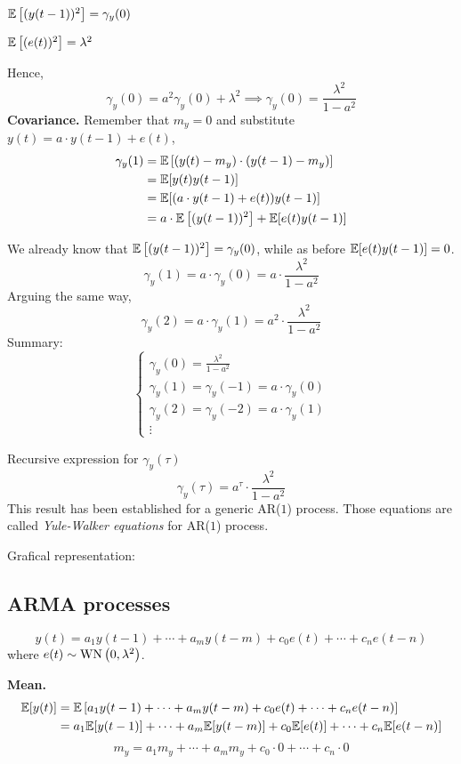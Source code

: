 $\mathbb{E}\left[(y(t-1))^{2}\right]=\gamma_{y}(0)$

$\mathbb{E}\left[(e(t))^{2}\right]=\lambda^{2}$

Hence,
\[
	\gamma_{y}(0)=a^{2} \gamma_{y}(0)+\lambda^{2} \implies \gamma_{y}(0)=\frac{\lambda^{2}}{1-a^{2}}
\]
\textbf{Covariance.}
Remember that $m_{y}=0$ and substitute $y(t)=a \cdot y(t-1)+e(t)$,
\begin{align*}
	\gamma_{y}(1)&=\mathbb{E}\left[\left(y(t)-m_{y}\right) \cdot\left(y(t-1)-m_{y}\right)\right]\\
	&=\mathbb{E}[y(t) y(t-1)]\\
	&=\mathbb{E}[(a \cdot y(t-1)+e(t))y(t-1)]\\
	&=a \cdot \mathbb{E}\left[(y(t-1))^{2}\right]+\mathbb{E}[e(t) y(t-1)]
\end{align*}

We already know that $\mathbb{E}\left[(y(t-1))^{2}\right]=\gamma_{y}(0)$, while as before $\mathbb{E}[e(t) y(t-1)]=0$.
$$
\gamma_{y}(1)=a \cdot \gamma_{y}(0)=a \cdot \frac{\lambda^{2}}{1-a^{2}}
$$
Arguing the same way,
\[
	\gamma_{y}(2)=a \cdot \gamma_{y}(1)=a^{2} \cdot \frac{\lambda^{2}}{1-a^{2}}
\]
Summary:
\begin{equation*}
	\boxed{
		\begin{cases}
			\gamma_{y}(0)=\frac{\lambda^{2}}{1-a^{2}} \\
			\gamma_{y}(1)=\gamma_{y}(-1)=a \cdot \gamma_{y}(0) \\
			\gamma_{y}(2)=\gamma_{y}(-2)=a \cdot \gamma_{y}(1) \\
			\vdots
		\end{cases}
	}
\end{equation*}

Recursive expression for $\gamma_{y}(\tau)$
$$
	\gamma_{y}(\tau)=a^{\tau} \cdot \frac{\lambda^{2}}{1-a^{2}}
$$
This result has been established for a generic AR($1$) process.
Those equations are called \emph{Yule-Walker equations} for AR($1$) process.

Grafical representation:



\subsection{ARMA processes}
$$
y(t)=a_{1} y(t-1)+\cdots+a_{m} y(t-m)+c_{0} e(t)+\cdots+c_{n} e(t-n)
$$
where $e(t) \sim \operatorname{WN}\left(0, \lambda^{2}\right)$.

\textbf{Mean.}
\begin{align*}
	\mathbb{E}[y(t)] &=\mathbb{E}\left[a_{1} y(t-1)+\cdots+a_{m} y(t-m)+c_{0} e(t)+\cdots+c_{n} e(t-n)\right] \\
	&=a_{1} \mathbb{E}[y(t-1)]+\cdots+a_{m} \mathbb{E}[y(t-m)]+c_{0} \mathbb{E}[e(t)]+\cdots+c_{n} \mathbb{E}[e(t-n)]
\end{align*}
$$
m_{y}=a_{1} m_{y}+\cdots+a_{m} m_{y}+c_{0} \cdot 0+\cdots+c_{n} \cdot 0
$$

